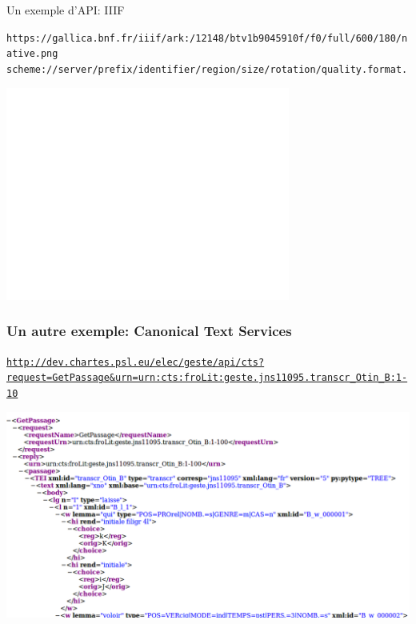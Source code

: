 \documentclass[ignorenonframetext]{beamer}
\begin{document}
\begin{frame}{Un exemple d'API: IIIF}


\begin{block}{} \footnotesize
	\texttt{https://gallica.bnf.fr/iiif/ark:/12148/btv1b9045910f/f0/full/600/180/native.png}\\
	\texttt{{scheme}://{server}{/prefix}/{identifier}/{region}/{size}/{rotation}/{quality}.{format}.}
\end{block}

\begin{center}
	\includegraphics[width=0.7\textwidth]{img/Casa.png}
\end{center}

\end{frame}

\begin{frame}[fragile]

\frametitle{Un autre exemple: Canonical Text Services}


\begin{block}{} \small

\href{http://dev.chartes.psl.eu/elec/geste/api/cts?request=GetPassage&urn=urn:cts:froLit:geste.jns11095.transcr_Otin_B:1-10}{\texttt{http://dev.chartes.psl.eu/elec/geste/api/cts?request=GetPassage\&urn=urn:cts:froLit:geste.jns11095.transcr\_Otin\_B:1-10}}
	
\end{block}

\includegraphics[width=\textwidth]{img/NemoAPI.png}

\end{frame}
\end{document}
